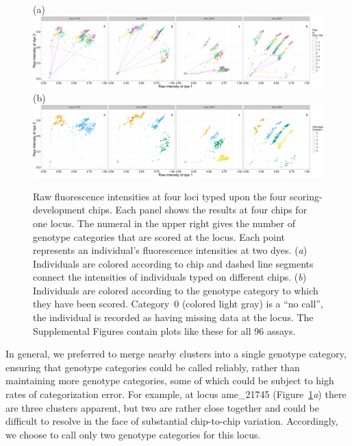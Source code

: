 \begin{figure}
(a)\\
\includegraphics[width = \textwidth]{inputs/four_loci_by_plate-crop.pdf} \\
(b)\\
\includegraphics[width = \textwidth]{inputs/four_loci_by_geno-crop.pdf}
\caption{ Raw \snptype{} fluorescence intensities at four loci typed upon the four
scoring-development chips. Each panel
shows the results at four chips for one locus.  The numeral in the upper right gives the number
of genotype categories that are scored at the locus.  Each point represents an individual's fluorescence
intensities at two dyes. ({\em a}) Individuals are colored according to chip and dashed line
segments connect the intensities of individuals typed on different chips. ({\em b}) Individuals are colored
according to the genotype category to which they have been scored.  Category~0 (colored light gray) is a ``no call'', \ie the individual
is recorded as having missing data at the locus. The Supplemental Figures contain plots 
like these for all 96 assays.}
\label{fig:plate_xy}
\end{figure}
In general, we preferred to merge
nearby clusters into a single genotype category, ensuring that genotype
categories could be called reliably, rather than maintaining 
more genotype
categories, some of which could be subject to high rates of
categorization error. For example, at 
locus ame\_21745 (Figure~\ref{fig:plate_xy}{\em a})    
there are three clusters apparent, but two  
are rather close together and could be difficult to resolve in the face of
substantial chip-to-chip variation.   Accordingly,
we choose to call only two genotype categories for this locus.

